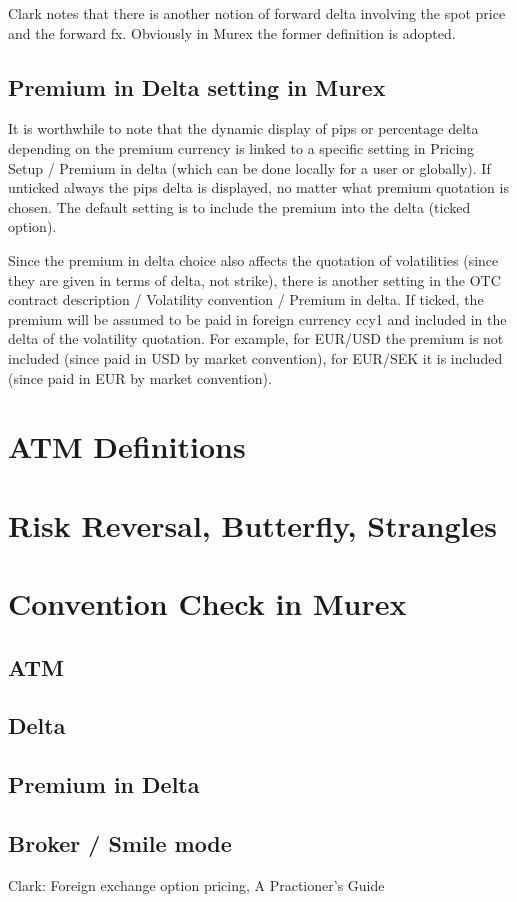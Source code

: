 \documentclass{amsart}
\theoremstyle{plain}
\numberwithin{equation}{section}
\begin{document}
Clark notes that there is another notion of forward delta involving the spot price and the forward
fx. Obviously in Murex the former definition is adopted.

\subsection{Premium in Delta setting in Murex}

It is worthwhile to note that the dynamic display of pips or percentage delta depending on the premium
currency is linked to a specific setting in Pricing Setup / Premium in delta (which can be done
locally for a user or globally). If unticked always the pips delta is displayed, no matter what premium
quotation is chosen. The default setting is to include the premium into the delta (ticked option).

Since the premium in delta choice also affects the quotation of volatilities (since they are given
in terms of delta, not strike), there is another setting in the OTC contract description / Volatility
convention / Premium in delta. If ticked, the premium will be assumed to be paid in foreign currency
ccy1 and included in the delta of the volatility quotation. For example, for EUR/USD the premium is not
included (since paid in USD by market convention), for EUR/SEK it is included (since paid in EUR by market
convention).

\section{ATM Definitions}



\section{Risk Reversal, Butterfly, Strangles}



\section{Convention Check in Murex}

\subsection{ATM}

\subsection{Delta}

\subsection{Premium in Delta}

\subsection{Broker / Smile mode}



\begin{thebibliography}{4}

Clark: Foreign exchange option pricing, A Practioner's Guide

\end{thebibliography}
  
\end{document}
